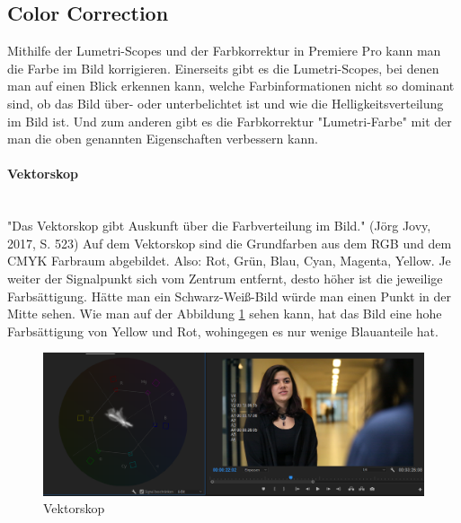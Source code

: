 \subsection{Color Correction}
Mithilfe der Lumetri-Scopes und der Farbkorrektur in Premiere Pro kann man die Farbe im Bild korrigieren. Einerseits gibt es die Lumetri-Scopes, bei denen man auf einen Blick erkennen kann, welche Farbinformationen nicht so dominant sind, ob das Bild über- oder unterbelichtet ist und wie die Helligkeitsverteilung im Bild ist. Und zum anderen gibt es die Farbkorrektur "Lumetri-Farbe" mit der man die oben genannten Eigenschaften verbessern kann.\citep{cc}
\paragraph{Vektorskop}
\leavevmode \\
"Das Vektorskop gibt Auskunft über die Farbverteilung im Bild." (Jörg Jovy, 2017, S. 523) Auf dem Vektorskop sind die Grundfarben aus dem RGB und dem CMYK Farbraum abgebildet. Also: Rot, Grün, Blau, Cyan, Magenta, Yellow. Je weiter der Signalpunkt sich vom Zentrum entfernt, desto höher ist die jeweilige Farbsättigung. Hätte man ein Schwarz-Weiß-Bild würde man einen Punkt in der Mitte sehen.\citep{vektorskop}\newline
Wie man auf der Abbildung \ref{fig:abb22} sehen kann, hat das Bild eine hohe Farbsättigung von Yellow und Rot, wohingegen es nur wenige Blauanteile hat.
\begin{figure}[H]
	\centering
	\includegraphics[width=1.0\textwidth]{abb22} 
	\caption{Vektorskop}\label{fig:abb22}
\end{figure}
